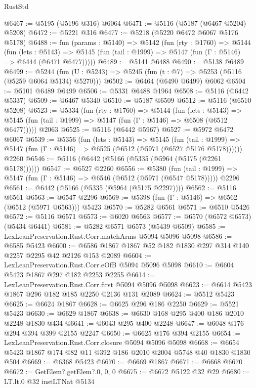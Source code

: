 \begin{lexlean}{RustStd}
\begin{coremodule}
{\begin{coremodule}
{{{{{{{{{{{{{{{{{{{{{{{{{{{{{{{@6467 := @5195 (@5196 @316) @6064
@6471 := @5116 (@5187 (@6467 @5204) @5208)
@6472 := @5221 @316
@6477 := @5218 (@5220 @6472 @6067 @5176 @5178)
@6488 := fun (params : @5140) =>
  @5142
    (fun (rty : @1760) =>
    @5144
      (fun (lets : @5143) =>
      @5145 (fun (tail : @1999) => @5147 (fun (Γ : @5146) => @6444 (@6471 @6477)))))
@6489 := @5141 @6488
@6490 := @5138 @6489
@6499 := @5244 (fun (U : @5243) => @5245 (fun (t : @7) => @5253 (@5116 (@5259 @6064 @5134) @5270)))
@6502 := @6464 (@6490 @6499) @6062
@6504 := @5101 @6489 @6499
@6506 := @5331 @6488 @1964
@6508 := @5116 (@6442 @5337)
@6509 := @6467 @5340
@6510 := @5187 @6509
@6512 := @5116 (@6510 @5208)
@6523 := @5334
    (fun (rty : @1760) =>
    @5144
      (fun (lets : @5143) =>
      @5145 (fun (tail : @1999) => @5147 (fun (Γ : @5146) => @6508 (@6512 @6477)))))
    @2063
@6525 := @5116 (@6442 @5967)
@6527 := @5972 @6472 @6067
@6539 := @5356
    (fun (lets : @5143) =>
    @5145
      (fun (tail : @1999) => @5147 (fun (Γ : @5146) => @6525 (@6512 (@5971 (@6527 @5176 @5178))))))
    @2260
@6546 := @5116 (@6442 (@5166 (@5335 (@5964 (@5175 (@2261 @5178))))))
@6547 := @6527 @2260
@6556 := @5380
    (fun (tail : @1999) => @5147 (fun (Γ : @5146) => @6546 (@6512 (@5971 (@6547 @5178)))))
    @2296
@6561 := @6442 (@5166 (@5335 (@5964 (@5175 @2297))))
@6562 := @5116 @6561
@6563 := @6547 @2296
@6569 := @5398 (fun (Γ : @5146) => @6562 (@6512 (@5971 @6563))) @5423
@6570 := @5282 @6561
@6571 := @6510 @5426
@6572 := @5116 @6571
@6573 := @6020 @6563
@6577 := @6570 (@6572 @6573) (@5434 @6441)
@6581 := @5282 @6571 @6573 (@5439 @6509)
@6585 := LexLeanPreservation.Rust.Corr.matchArms @5094 @5096 @5098
@6586 := @6585 @5423
@6600 := @6586 @1867 @1867 @52 @182 @1830 @297 @314 @140 @2257 @2295 @42 @2126 @153 @2089
@6604 := LexLeanPreservation.Rust.Corr.eOfB @5094 @5096 @5098
@6610 := @6604 @5423 @1867 @297 @182 @2253 @2255
@6614 := LexLeanPreservation.Rust.Corr.first @5094 @5096 @5098
@6623 := @6614 @5423 @1867 @296 @182 @185 @2250 @2136 @131 @2089
@6624 := @5512 @5423
@6625 := @6624 @1867
@6628 := @6625 @296 @186 @2250
@6629 := @5521 @5423
@6630 := @6629 @1867
@6638 := @6630 @168 @295 @400 @186 @2010 @2248 @1830 @434
@6641 := @6043 @295 @400 @2248
@6647 := @6048 @176 @294 @394 @399 @2155 @2247
@6650 := @6625 @176 @394 @2155
@6654 := LexLeanPreservation.Rust.Corr.closure @5094 @5096 @5098
@6668 := @6654 @5423 @1867 @174 @82 @11 @392 @186 @2010 @2004 @5748 @40 @1830 @1830 @504
@6669 := @6368 @5423
@6670 := @6669 @1867
@6671 := @6668 @6670
@6672 := GetElem?.getElem?.{0, 0, 0}
@6675 := @6672 @5122 @32 @29
@6680 := LT.lt.{0} @32 instLTNat @5134
}}}}}}}}}}}}}}}}}}}}}}}}}}}}}}}
\end{coremodule}}
\end{coremodule}
\end{lexlean}
